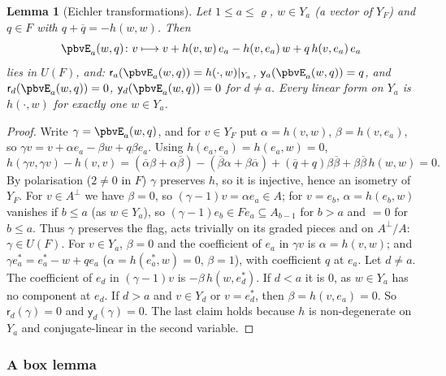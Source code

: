 \documentclass[10pt]{amsart}
\newtheorem{lemma}[theorem]{Lemma}
\theoremstyle{definition}
\theoremstyle{remark}
\providecommand{\aubar}[1]{\overline{#1}}
\begin{document}
\begin{lemma}[Eichler transformations]\label{pbv:eichler}
Let $1\le a\le\varrho$, $w\in Y_a$ \textup{(}a vector of $Y_F$\textup{)} and $q\in F$ with $q+\aubar q=
-h(w,w)$. Then
\[
\pbvE_a(w,q)\colon v\longmapsto v+h(v,w)\,e_a-h(v,e_a)\,w+q\,h(v,e_a)\,e_a
\]
lies in $U(F)$, and: $\mathsf r_a(\pbvE_a(w,q))=h(\cdot,w)|_{Y_a}$, $\mathsf y_a(\pbvE_a(w,q))=q$, and
$\mathsf r_d(\pbvE_a(w,q))=0$, $\mathsf y_d(\pbvE_a(w,q))=0$ for $d\ne a$. Every linear form on $Y_a$ is
$h(\cdot,w)$ for exactly one $w\in Y_a$.
\end{lemma}
\begin{proof}
Write $\gamma=\pbvE_a(w,q)$, and for $v\in Y_F$ put $\alpha=h(v,w)$, $\beta=h(v,e_a)$, so $\gamma v=v+
\alpha e_a-\beta w+q\beta e_a$. Using $h(e_a,e_a)=h(e_a,w)=0$,
\[
h(\gamma v,\gamma v)-h(v,v)=(\aubar\alpha\beta+\alpha\aubar\beta)-(\aubar\beta\alpha+\beta\aubar\alpha)+
(\aubar q+q)\beta\aubar\beta+\beta\aubar\beta\,h(w,w)=0 .
\]
By polarisation ($2\ne0$ in $F$) $\gamma$ preserves $h$, so it is injective, hence an isometry of $Y_F$. For
$v\in A^\perp$ we have $\beta=0$, so $(\gamma-1)v=\alpha e_a\in A$; for $v=e_b$, $\alpha=h(e_b,w)$ vanishes
if $b\le a$ (as $w\in Y_a$), so $(\gamma-1)e_b\in Fe_a\subseteq A_{b-1}$ for $b>a$ and $=0$ for $b\le a$.
Thus $\gamma$ preserves the flag, acts trivially on its graded pieces and on $A^\perp/A$: $\gamma\in U(F)$.
For $v\in Y_a$, $\beta=0$ and the coefficient of $e_a$ in $\gamma v$ is $\alpha=h(v,w)$; and $\gamma e_a^*=e_a^*-w+
qe_a$ ($\alpha=h(e_a^*,w)=0$, $\beta=1$), with coefficient $q$ at $e_a$. Let $d\ne a$. The coefficient of $e_d$
in $(\gamma-1)v$ is $-\beta\,h(w,e_d^*)$. If $d<a$ it is $0$, as $w\in Y_a$ has no component at $e_d$. If $d>a$
and $v\in Y_d$ or $v=e_d^*$, then $\beta=h(v,e_a)=0$. So $\mathsf r_d(\gamma)=0$ and $\mathsf y_d(\gamma)=0$.
The last claim holds because $h$ is non-degenerate on $Y_a$ and conjugate-linear in the second variable.
\end{proof}

\subsubsection{A box lemma}\label{pbv:ss-box}
\end{document}
